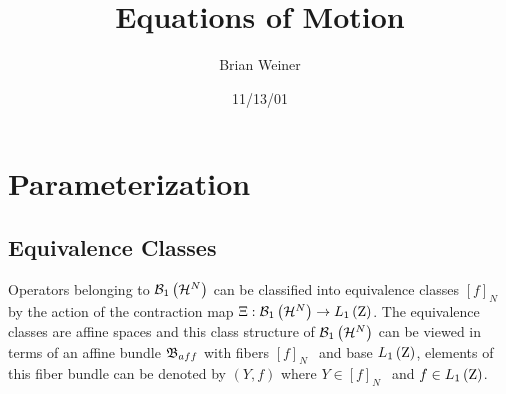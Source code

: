 

\newtheorem{theorem}{Theorem}
\newtheorem{acknowledgement}[theorem]{Acknowledgement}
\newtheorem{algorithm}[theorem]{Algorithm}
\newtheorem{axiom}[theorem]{Axiom}
\newtheorem{claim}[theorem]{Claim}
\newtheorem{conclusion}[theorem]{Conclusion}
\newtheorem{condition}[theorem]{Condition}
\newtheorem{conjecture}[theorem]{Conjecture}
\newtheorem{corollary}[theorem]{Corollary}
\newtheorem{criterion}[theorem]{Criterion}
\newtheorem{definition}[theorem]{Definition}
\newtheorem{example}[theorem]{Example}
\newtheorem{exercise}[theorem]{Exercise}
\newtheorem{lemma}[theorem]{Lemma}
\newtheorem{notation}[theorem]{Notation}
\newtheorem{problem}[theorem]{Problem}
\newtheorem{proposition}[theorem]{Proposition}
\newtheorem{remark}[theorem]{Remark}
\newtheorem{solution}[theorem]{Solution}
\newtheorem{summary}[theorem]{Summary}


\title{Equations of Motion}
\author{Brian Weiner}
\date{11/13/01}
\maketitle

\section{Parameterization}

\subsection{Equivalence Classes}

Operators belonging to ${\cal B}_{1}\left( {\cal H}^{N}\right) $ can be
classified into equivalence classes $\left[ f\right] _{N\text{ }}$by the
action of the contraction map $\Xi :{\cal B}_{1}\left( {\cal H}^{N}\right)
\rightarrow L_{1}\left( {\rm Z}\right) $. The equivalence classes are affine
spaces and this class structure of ${\cal B}_{1}\left( {\cal H}^{N}\right) $
can be viewed in terms of an affine bundle ${\frak B}_{aff}$ with fibers $%
\left[ f\right] _{N\text{ }}$ and base $L_{1}\left( {\rm Z}\right) $,
elements of this fiber bundle can be denoted by $\left( Y,f\right) $ where $%
Y\in \left[ f\right] _{N\text{ }}$ and $f\in L_{1}\left( {\rm Z}\right) $.

